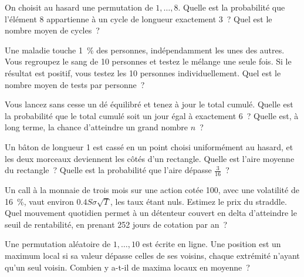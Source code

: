 
\begin{question}\label{iq:iv1:timed-test-3:7}
On choisit au hasard une permutation de $1, \dots, 8$. Quelle est la probabilité que l'élément 8 appartienne à un cycle de longueur exactement 3~? Quel est le nombre moyen de cycles~?
\end{question}

\begin{question}\label{iq:iv1:timed-test-3:8}
Une maladie touche 1~\% des personnes, indépendamment les unes des autres. Vous regroupez le sang de 10 personnes et testez le mélange une seule fois. Si le résultat est positif, vous testez les 10 personnes individuellement. Quel est le nombre moyen de tests par personne~?
\end{question}

\begin{question}\label{iq:iv1:timed-test-3:9}
Vous lancez sans cesse un dé équilibré et tenez à jour le total cumulé. Quelle est la probabilité que le total cumulé soit un jour égal à exactement 6~? Quelle est, à long terme, la chance d'atteindre un grand nombre $n$~?
\end{question}

\begin{question}\label{iq:iv1:timed-test-3:10}
Un bâton de longueur 1 est cassé en un point choisi uniformément au hasard, et les deux morceaux deviennent les côtés d'un rectangle. Quelle est l'aire moyenne du rectangle~? Quelle est la probabilité que l'aire dépasse $\frac{3}{16}$~?
\end{question}

\begin{question}\label{iq:iv1:timed-test-3:11}
Un call à la monnaie de trois mois sur une action cotée 100, avec une volatilité de 16~\%, vaut environ $0.4S\sigma\sqrt{T}$, les taux étant nuls. Estimez le prix du straddle. Quel mouvement quotidien permet à un détenteur couvert en delta d'atteindre le seuil de rentabilité, en prenant 252 jours de cotation par an~?
\end{question}

\begin{question}\label{iq:iv1:timed-test-3:12}
Une permutation aléatoire de $1, \dots, 10$ est écrite en ligne. Une position est un maximum local si sa valeur dépasse celles de ses voisins, chaque extrémité n'ayant qu'un seul voisin. Combien y a-t-il de maxima locaux en moyenne~?
\end{question}
